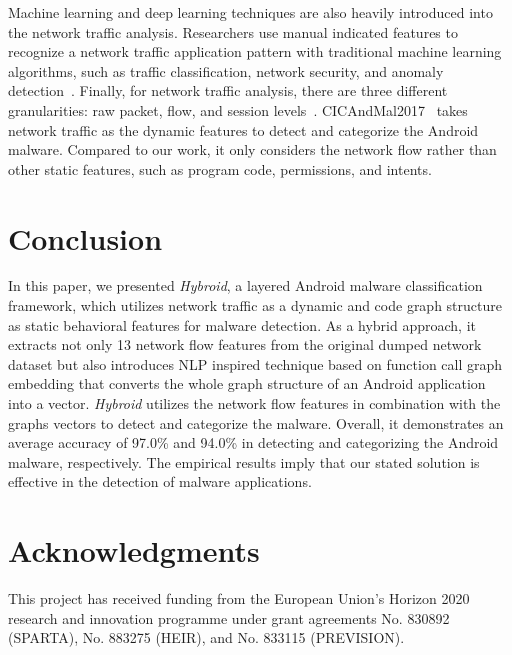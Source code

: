 \documentclass[runningheads]{llncs}
\newcommand{\toolname}{\textit{Hybroid}\xspace}
\newcommand{\netfeatures}{{13}\xspace}
\begin{document}
Machine learning and deep learning techniques are also heavily introduced into the network traffic analysis. Researchers use manual indicated features to recognize a network traffic application pattern with traditional machine learning algorithms, such as traffic classification, network security, and anomaly detection~\cite{malik2016credroid,zulkifli2018android,wang2017malware}. Finally, for network traffic analysis, there are three different granularities: raw packet, flow, and session levels~\cite{wang2017malware,marin2020deepmal,lashkari2018toward,taheri2019extensible}. CICAndMal2017~\cite{lashkari2018toward} takes network traffic as the dynamic features to detect and categorize the Android malware. Compared to our work, it only considers the network flow rather than other static features, such as program code, permissions, and intents.


\section{Conclusion}

In this paper, we presented \toolname, a layered Android malware classification framework, which utilizes network traffic as a dynamic and code graph structure as static behavioral features for malware detection. As a hybrid approach, it extracts not only \netfeatures network flow features from the original dumped network dataset but also introduces NLP inspired technique based on function call graph embedding that converts the whole graph structure of an Android application into a vector. \toolname utilizes the network flow features in combination with the graphs vectors to detect and categorize the malware. Overall, it demonstrates an average accuracy of 97.0\% and 94.0\% in detecting and categorizing the Android malware, respectively. The empirical results imply that our stated solution is effective in the detection of malware applications.


\section*{Acknowledgments}

This project has received funding from the European Union’s Horizon 2020 research and innovation programme under grant agreements No. 830892 (SPARTA), No. 883275 (HEIR), and No. 833115 (PREVISION).




\end{document}
